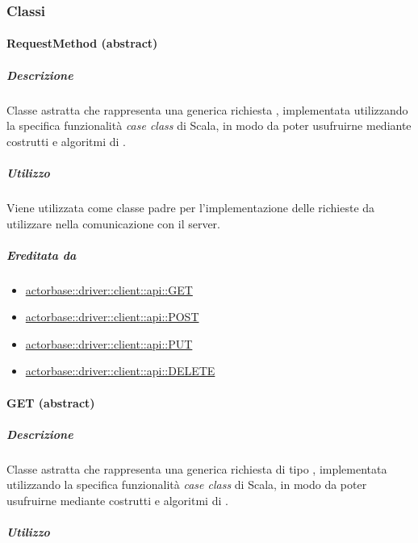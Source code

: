 \documentclass{scalatekids-article}
\begin{document}
\subsubsection{Classi}

\paragraph{RequestMethod (abstract)}
\label{sec:actorbase::driver::client::api::RequestMethod}

\subparagraph{Descrizione}

Classe astratta che rappresenta una generica richiesta ,
implementata utilizzando la specifica funzionalità \textit{case class} di Scala,
in modo da poter usufruirne mediante costrutti e algoritmi di .

\subparagraph{Utilizzo}

Viene utilizzata come classe padre per l'implementazione delle richieste
 da utilizzare nella comunicazione con il server.

\subparagraph{Ereditata da}

\begin{itemize}
\item \hyperref[sec:actorbase::driver::client::api::GET]{actorbase::driver::client::api::GET}
\item \hyperref[sec:actorbase::driver::client::api::POST]{actorbase::driver::client::api::POST}
\item \hyperref[sec:actorbase::driver::client::api::PUT]{actorbase::driver::client::api::PUT}
\item \hyperref[sec:actorbase::driver::client::api::DELETE]{actorbase::driver::client::api::DELETE}
\end{itemize}


\paragraph{GET (abstract)}
\label{sec:actorbase::driver::client::api::GET}

\subparagraph{Descrizione}

Classe astratta che rappresenta una generica richiesta  di tipo
, implementata utilizzando la specifica funzionalità \textit{case
  class} di Scala, in modo da poter usufruirne mediante costrutti e algoritmi di
.

\subparagraph{Utilizzo}
\end{document}
